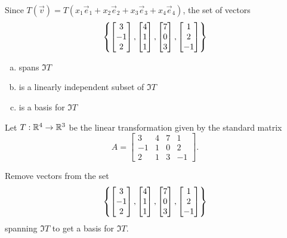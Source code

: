 \begin{applicationActivities}
\begin{activity}{5}
Since \(T(\vec v)=T(x_1\vec e_1+x_2\vec e_2+x_3\vec e_3+x_4\vec e_4)\),
the set of vectors
\[
  \left\{
    \begin{bmatrix}3\\-1\\2\end{bmatrix},
    \begin{bmatrix}4\\1\\1\end{bmatrix},
    \begin{bmatrix}7\\0\\3\end{bmatrix},
    \begin{bmatrix}1\\2\\-1\end{bmatrix}
  \right\}
\]
\begin{enumerate}[a)]
\item spans \(\Im T\)
\item is a linearly independent subset of \(\Im T\)
\item is a basis for \(\Im T\)
\end{enumerate}
\end{activity}


\begin{activity}{5}
Let $T: \mathbb{R}^4 \rightarrow \mathbb{R}^3$ be the linear transformation given by the
standard matrix
\[
  A
    =
  \begin{bmatrix} 3 & 4 & 7 & 1\\ -1 & 1 & 0 & 2 \\ 2 & 1 & 3 & -1 \end{bmatrix}
.\]

Remove vectors from the set
\[
  \left\{
    \begin{bmatrix}3\\-1\\2\end{bmatrix},
    \begin{bmatrix}4\\1\\1\end{bmatrix},
    \begin{bmatrix}7\\0\\3\end{bmatrix},
    \begin{bmatrix}1\\2\\-1\end{bmatrix}
  \right\}
\]
spanning \(\Im T\) to get a basis for \(\Im T\).
\end{activity}


\end{applicationActivities}
